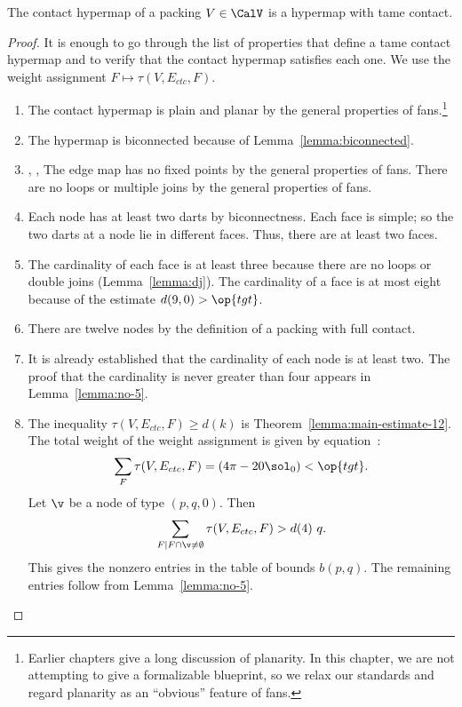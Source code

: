 
\begin{theorem} The contact hypermap of a 
  packing $V\in \CalV$ is a hypermap with tame contact.
\end{theorem}
%
%
%
%

\begin{proof} It is enough to go through the list of properties that
  define a tame contact hypermap and to verify that the contact
  hypermap satisfies each one.  We use the weight assignment $F\mapsto
  \tau(V,E_{ctc},F)$.

\begin{enumerate}
\item {} The contact hypermap is plain and planar by the
  general properties of fans.\footnote{Earlier chapters give a long
    discussion of planarity.  In this chapter, we are not attempting
    to give a formalizable blueprint, so we relax our standards and
    regard planarity as an ``obvious'' feature of fans.}
\item {} The hypermap is biconnected because of
  Lemma~\ref{lemma:biconnected}.
\item {}, ,  The
  edge map has no fixed points by the general properties of fans.
  There are no loops or multiple joins by the general properties of
  fans.
\item {} Each node has at least two darts by
  biconnectness. Each face is simple; so the two darts at a node lie
  in different faces.  Thus, there are at least two faces.
\item {} The cardinality of each face is at least three
  because there are no loops or double joins (Lemma~\ref{lemma:dj}).
  The cardinality of a face is at most eight because of the estimate
  $d(9,0)>\op{tgt}$.
\item {} There are twelve nodes by the definition of a
  packing with full contact.
\item {} It is already established that the cardinality
  of each node is at least two.  The proof that the cardinality is
  never  greater than four appears in Lemma~\ref{lemma:no-5}.
\item {} The inequality $\tau(V,E_{ctc},F)\ge d(k)$ is
  Theorem~\ref{lemma:main-estimate-12}.
  The total weight of the weight assignment is given by
  equation~:
\[
  \sum_F \tau(V,E_{ctc},F) = (4\pi - 20\sol_0) < \op{tgt}.
\]
%
Let $\v$ be a node of type $(p,q,0)$.  
Then
\[
\sum_{F\mid F\cap \v\ne\emptyset}\tau(V,E_{ctc},F) > d(4)~q.
\]
This gives the nonzero entries in the table of bounds $b(p,q)$.  The
remaining entries follow from Lemma~\ref{lemma:no-5}.
\end{enumerate}
\end{proof}
